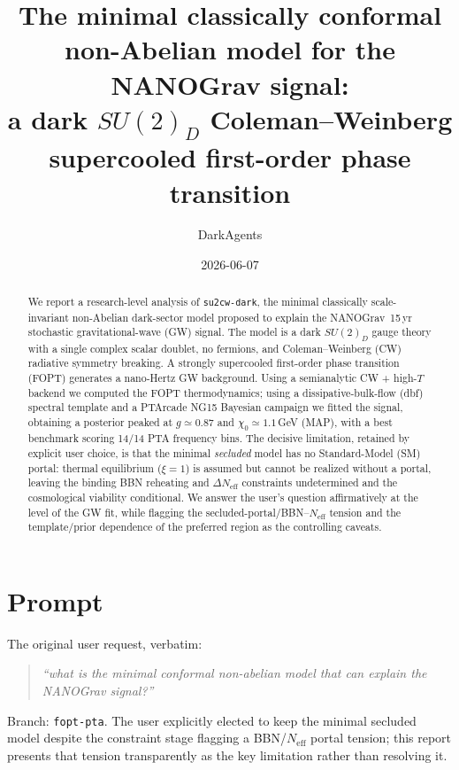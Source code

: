 \documentclass[11pt]{article}
\title{\textbf{The minimal classically conformal non-Abelian model for the NANOGrav signal:\\
a dark $SU(2)_D$ Coleman--Weinberg supercooled first-order phase transition}}
\author{DarkAgents}
\date{2026-06-07}
\newcommand{\Neff}{N_{\mathrm{eff}}}
\newcommand{\chizero}{\chi_0}
\begin{document}
\maketitle

\begin{abstract}
We report a research-level analysis of \texttt{su2cw-dark}, the minimal classically scale-invariant
non-Abelian dark-sector model proposed to explain the NANOGrav~15\,yr stochastic gravitational-wave
(GW) signal. The model is a dark $SU(2)_D$ gauge theory with a single complex scalar doublet, no
fermions, and Coleman--Weinberg (CW) radiative symmetry breaking. A strongly supercooled first-order
phase transition (FOPT) generates a nano-Hertz GW background. Using a semianalytic CW + high-$T$
backend we computed the FOPT thermodynamics; using a dissipative-bulk-flow (dbf) spectral template
and a PTArcade NG15 Bayesian campaign we fitted the signal, obtaining a posterior peaked at
$g\simeq0.87$ and $\chizero\simeq1.1\,$GeV (MAP), with a best benchmark scoring 14/14 PTA frequency
bins. The decisive limitation, retained by explicit user choice, is that the minimal \emph{secluded}
model has no Standard-Model (SM) portal: thermal equilibrium ($\xi=1$) is assumed but cannot be
realized without a portal, leaving the binding BBN reheating and $\Delta\Neff$ constraints
undetermined and the cosmological viability conditional. We answer the user's question affirmatively
at the level of the GW fit, while flagging the secluded-portal/BBN--$\Neff$ tension and the
template/prior dependence of the preferred region as the controlling caveats.
\end{abstract}

\section{Prompt}
The original user request, verbatim:
\begin{quote}
\textit{``what is the minimal conformal non-abelian model that can explain the NANOGrav signal?''}
\end{quote}
Branch: \texttt{fopt-pta}. The user explicitly elected to keep the minimal secluded model despite the
constraint stage flagging a BBN/$\Neff$ portal tension; this report presents that tension
transparently as the key limitation rather than resolving it.
\end{document}
